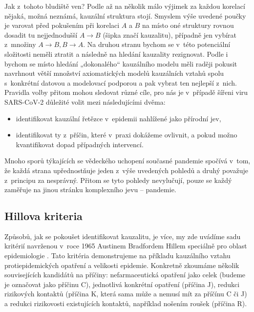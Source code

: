 Jak z~tohoto bludiště ven? Podle \cite{shipley_2000} až na několik málo výjimek za každou korelací nějaká, možná neznámá, kauzální struktura stojí. Smyslem výše uvedené poučky je varovat před pokušením při korelaci $A$ a $B$ na místo oné struktury rovnou dosadit tu nejjednodušší $A\rightarrow B$ (šipka značí kauzalitu), případně jen vybírat z~množiny $A\rightarrow B, B\rightarrow A$. Na druhou stranu bychom se v~této potenciální složitosti neměli ztratit a následně na hledání kauzality rezignovat. Podle \cite{shipley_2000} i \cite{pearl2009causality} bychom se místo hledání „dokonalého“ kauzálního modelu měli raději pokusit navrhnout větší množství axiomatických modelů kauzálních vztahů spolu s~konkrétní datovou a modelovací podporou a pak vybrat ten nejlepší z~nich. Pravidla volby přitom mohou sledovat různé cíle, pro nás je v~případě šířeni viru SARS-CoV-2 důležité volit mezi následujícími dvěma:
\begin{itemize}
\item identifikovat kauzální řetězce v~epidemii nahlížené jako přírodní jev,
\item identifikovat ty z~příčin, které v~praxi dokážeme ovlivnit, a pokud možno kvantifikovat dopad případných intervencí.
\end{itemize}
Mnoho sporů týkajících se vědeckého uchopení současné pandemie spočívá v~tom, že každá strana upřednostňuje jeden z~výše uvedených pohledů a druhý považuje z~principu za nesprávný. Přitom se tyto pohledy nevylučují, pouze se každý zaměřuje na jinou stránku komplexního jevu -- pandemie. 


\subsection*{Hillova kriteria}

Způsobů, jak se pokoušet identifikovat kauzalitu, je více,
my zde uvádíme sadu kritérií navrženou v~roce 1965 Austinem Bradfordem Hillem
speciálně pro oblast epidemiologie \cite{hill1965environment}. Tato kritéria demonstrujeme na příkladu kauzálního vztahu protiepidemických opatření a velikosti epidemie. Konkretně zkoumáme několik souvisejících kandidátů na příčiny: nefarmaceutická opatření jako celek (budeme je označovat jako příčinu C),
jednotlivá konkrétní opatření (příčina J), redukci rizikových
kontaktů (příčina K, která sama může a nemusí mít za příčínu C či
J) a redukci rizikovosti existujících kontaktů, například nošením roušek (příčina
R). 

